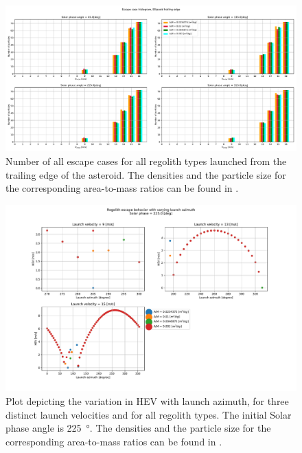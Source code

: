 \begin{figure}[htb]
\centering
\captionsetup{justification=centering}
\includegraphics[angle=90, width=\textwidth, height=\textheight, keepaspectratio=true]{trailing_edge_perturbations/allEscapeCases.pdf}
\caption{Number of all escape cases for all regolith types launched from the trailing edge of the asteroid. The densities and the particle size for the corresponding area-to-mass ratios can be found in .}
\label{fig:trailingEdge_allParticles_escape_hist}
\end{figure}
\FloatBarrier
\begin{figure}[htb]
\centering
\captionsetup{justification=centering}
\includegraphics[width=\textwidth, height=0.6\textheight, keepaspectratio=true]{trailing_edge_perturbations/hev_solarPhase225.pdf}
\caption{Plot depicting the variation in \gls{HEV} with launch azimuth, for three distinct launch velocities and for all regolith types. The initial Solar phase angle is \SI{225}{\degree}. The densities and the particle size for the corresponding area-to-mass ratios can be found in .}
\label{fig:trailingEdge_hev_solarPhase225}
\end{figure}
